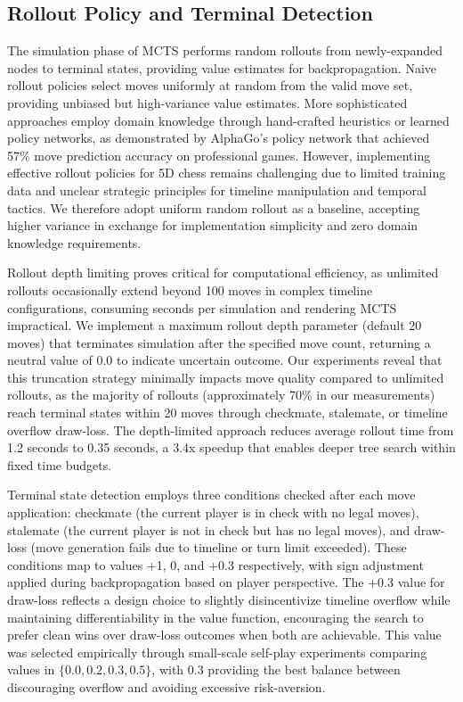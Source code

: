 \documentclass{article}
\begin{document}
\subsection{Rollout Policy and Terminal Detection}

The simulation phase of MCTS performs random rollouts from newly-expanded nodes to terminal states, providing value estimates for backpropagation. Naive rollout policies select moves uniformly at random from the valid move set, providing unbiased but high-variance value estimates. More sophisticated approaches employ domain knowledge through hand-crafted heuristics or learned policy networks, as demonstrated by AlphaGo's policy network that achieved 57\% move prediction accuracy on professional games. However, implementing effective rollout policies for 5D chess remains challenging due to limited training data and unclear strategic principles for timeline manipulation and temporal tactics. We therefore adopt uniform random rollout as a baseline, accepting higher variance in exchange for implementation simplicity and zero domain knowledge requirements.

Rollout depth limiting proves critical for computational efficiency, as unlimited rollouts occasionally extend beyond 100 moves in complex timeline configurations, consuming seconds per simulation and rendering MCTS impractical. We implement a maximum rollout depth parameter (default 20 moves) that terminates simulation after the specified move count, returning a neutral value of 0.0 to indicate uncertain outcome. Our experiments reveal that this truncation strategy minimally impacts move quality compared to unlimited rollouts, as the majority of rollouts (approximately 70\% in our measurements) reach terminal states within 20 moves through checkmate, stalemate, or timeline overflow draw-loss. The depth-limited approach reduces average rollout time from 1.2 seconds to 0.35 seconds, a 3.4x speedup that enables deeper tree search within fixed time budgets.

Terminal state detection employs three conditions checked after each move application: checkmate (the current player is in check with no legal moves), stalemate (the current player is not in check but has no legal moves), and draw-loss (move generation fails due to timeline or turn limit exceeded). These conditions map to values +1, 0, and +0.3 respectively, with sign adjustment applied during backpropagation based on player perspective. The +0.3 value for draw-loss reflects a design choice to slightly disincentivize timeline overflow while maintaining differentiability in the value function, encouraging the search to prefer clean wins over draw-loss outcomes when both are achievable. This value was selected empirically through small-scale self-play experiments comparing values in $\{0.0, 0.2, 0.3, 0.5\}$, with 0.3 providing the best balance between discouraging overflow and avoiding excessive risk-aversion.
\end{document}
